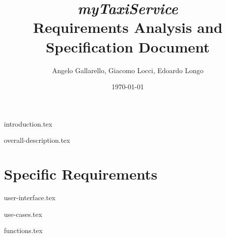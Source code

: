\documentclass[12pt, a4paper]{article}
\begin{document}
\title{ \emph{ myTaxiService}\\ Requirements Analysis and Specification Document }

\author{Angelo Gallarello, Giacomo Locci, Edoardo Longo}
\date{\today}
\maketitle

\newpage

\tableofcontents

\newpage

{introduction.tex}

{overall-description.tex}

\section{Specific Requirements} %
\label{sec:specific_rquirements}

{user-interface.tex}

{use-cases.tex}

{functions.tex}
\end{document}
